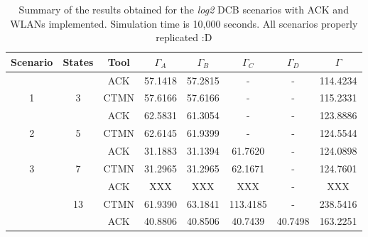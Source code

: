 \documentclass[a4paper]{article}
\begin{document}
\begin{table}[]
\centering
\caption{Summary of the results obtained for the \textit{log2} DCB scenarios with ACK and WLANs implemented. Simulation time is 10,000 seconds. All scenarios properly replicated :D}
\label{table:scenario_4wlans}
\begin{tabular}{|c|c|c|c|c|c|c|c|}
\hline
\textbf{Scenario}                           & \textbf{States}                              & \textbf{Tool} & $\Gamma_A$ & $\Gamma_B$ & $\Gamma_C$ & $\Gamma_D$ & $\Gamma$   \\ \hline
                                            &                                              & ACK       & 57.1418    & 57.2815    & -          & -          & 114.4234   \\ \cline{3-8} 
\multirow{-2}{*}{1}                         & \multirow{-2}{*}{3}                          & CTMN          & 57.6166    & 57.6166    & -          & -          & 115.2331   \\ \hline
                                            &                                              & ACK       & 62.5831    & 61.3054   & -          & -          & 123.8886   \\ \cline{3-8} 
\multirow{-2}{*}{2}                         & \multirow{-2}{*}{5}                          & CTMN          & 62.6145    & 61.9399    & -          & -          & 124.5544   \\ \hline
                                            &                                              & ACK       & 31.1883    & 31.1394    & 61.7620    & -          & 124.0898   \\ \cline{3-8} 
\multirow{-2}{*}{3}                         & \multirow{-2}{*}{7}                          & CTMN          & 31.2965    & 31.2965    & 62.1671    & -          & 124.7601   \\ \hline
\rowcolor[HTML]{FFCCC9} 
\cellcolor[HTML]{FFCCC9}                    & \cellcolor[HTML]{FFCCC9}                     & ACK       & XXX    & XXX  & XXX   & -          & XXX \\ \cline{3-8} 
\rowcolor[HTML]{FFCCC9} 
\multirow{-2}{*}{\cellcolor[HTML]{FFCCC9}4} & \multirow{-2}{*}{\cellcolor[HTML]{FFCCC9}13} & CTMN          & 61.9390    & 63.1841    & 113.4185   & -          & 238.5416   \\ \hline
                                            &                                              & ACK       & 40.8806   & 40.8506    & 40.7439    & 40.7498    & 163.2251   \\ \cline{3-8} 

\end{tabular}
\end{table}
\end{document}
